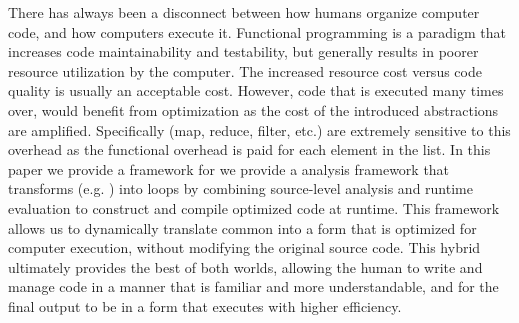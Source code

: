 There has always been a disconnect between how humans organize computer code, and how computers execute it.  Functional programming is a paradigm that increases code maintainability and testability, but generally results in poorer resource utilization by the computer.  The increased resource cost versus code quality is usually an acceptable cost. However, code that is executed many times over, would benefit from optimization as the cost of the introduced abstractions are amplified. Specifically \pipelines (map, reduce, filter, etc.) are extremely sensitive to this overhead as the functional overhead is paid for each element in the list. In this paper we provide a framework for we provide a \javascript analysis framework that transforms \pipelines (e.g. ) into  loops by combining source-level analysis and runtime evaluation to construct and compile optimized code at runtime.  This framework allows us to dynamically translate common \pipelines into a form that is optimized for computer execution, without modifying the original source code. This hybrid ultimately provides the best of both worlds, allowing the human to write and manage code in a manner that is familiar and more understandable, and for the final output to be in a form that executes with higher efficiency.